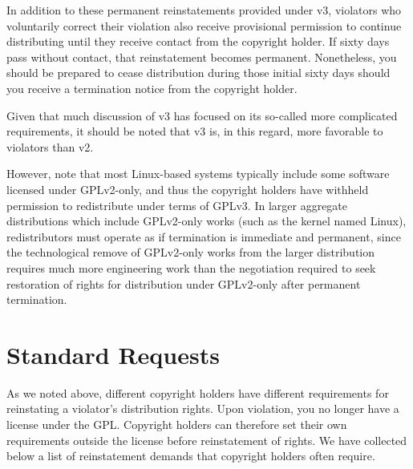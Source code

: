 In addition to these permanent reinstatements provided under v3, violators
who voluntarily correct their violation also receive provisional
permission to continue distributing until they receive contact from the
copyright holder.  If sixty days pass without contact, that reinstatement
becomes permanent.  Nonetheless, you should be prepared to cease
distribution during those initial sixty days should you receive a
termination notice from the copyright holder.

Given that much discussion of v3 has focused on its so-called more
complicated requirements, it should be noted that v3 is, in this regard,
more favorable to violators than v2.

However, note that most Linux-based systems typically include some software
licensed under GPLv2-only, and thus the copyright holders have withheld
permission to redistribute under terms of GPLv3.  In larger aggregate
distributions which include GPLv2-only works (such as the kernel named
Linux), redistributors must operate as if termination is immediate and
permanent, since the technological remove of GPLv2-only works from the larger
distribution requires much more engineering work than the negotiation
required to seek restoration of rights for distribution under GPLv2-only
after permanent termination.

\chapter{Standard Requests}
\label{enforcement-standard-requests}

As we noted above, different copyright holders have different requirements
for reinstating a violator's distribution rights.  Upon violation, you no
longer have a license under the GPL\@.  Copyright holders can therefore
set their own requirements outside the license before reinstatement of
rights.  We have collected below a list of reinstatement demands that
copyright holders often require.

